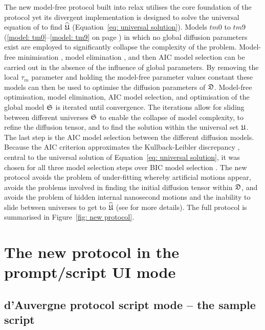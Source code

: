 The new model-free protocol built into relax utilises the core foundation of the \citet{Butterwick04} protocol yet its divergent implementation is designed to solve the universal equation of \citet{dAuvergneGooley07} to find $\widehat{\mathfrak{U}}$ (Equation~\ref{eq: universal solution}).
Models $tm0$ to $tm9$ (\ref{model: tm0}--\ref{model: tm9} on page \pageref{model: tm0}) in which no global diffusion parameters exist are employed to significantly collapse the complexity of the problem.
Model-free minimisation \citep{dAuvergneGooley08a}, model elimination \citep{dAuvergneGooley06}, and then AIC model selection \citep{Akaike73, dAuvergneGooley03} can be carried out in the absence of the influence of global parameters.
By removing the local $\tau_m$ parameter and holding the model-free parameter values constant these models can then be used to optimise the diffusion parameters of $\mathfrak{D}$.
Model-free optimisation, model elimination, AIC model selection, and optimisation of the global model $\mathfrak{S}$ is iterated until convergence.
The iterations allow for sliding between different universes $\mathfrak{S}$ to enable the collapse of model complexity, to refine the diffusion tensor, and to find the solution within the universal set $\mathfrak{U}$.
The last step is the AIC model selection between the different diffusion models.
Because the AIC criterion approximates the Kullback-Leibler discrepancy \citep{KullbackLeibler51}, central to the universal solution of Equation~\eqref{eq: universal solution}, it was chosen for all three model selection steps over BIC model selection \citep{Schwarz78, dAuvergneGooley03, Chen04}.
The new protocol avoids the problem of under-fitting whereby artificial motions appear, avoids the problems involved in finding the initial diffusion tensor within $\mathfrak{D}$, and avoids the problem of hidden internal nanosecond motions and the inability to slide between universes to get to $\widehat{\mathfrak{U}}$ (see \citet{dAuvergneGooley07} for more details).
The full protocol is summarised in Figure~\ref{fig: new protocol}.



\newpage
\section{The new protocol in the prompt/script UI mode}



\subsection{d'Auvergne protocol script mode -- the sample script}

